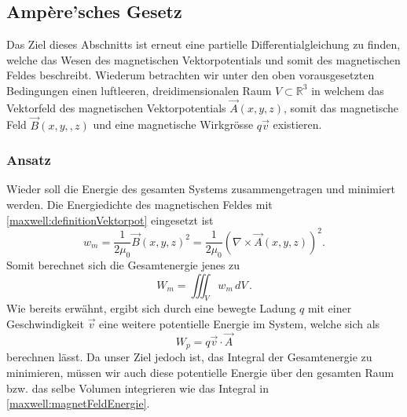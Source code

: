 

\subsection{Ampère'sches Gesetz}
Das Ziel dieses Abschnitts ist erneut eine partielle Differentialgleichung zu finden, welche das Wesen des magnetischen Vektorpotentials und somit des magnetischen Feldes beschreibt.
Wiederum betrachten wir unter den oben vorausgesetzten Bedingungen einen luftleeren, dreidimensionalen Raum $V \subset \mathbb{R}^3$ in welchem das Vektorfeld des magnetischen Vektorpotentials $\vec{A}(x,y,z)$, somit das magnetische Feld $\vec{B}(x,y,,z)$ und eine magnetische Wirkgrösse $q\vec{v}$  existieren. 

\subsubsection{Ansatz}

Wieder soll die Energie des gesamten Systems zusammengetragen und minimiert werden. 
Die Energiedichte des magnetischen Feldes mit \ref{maxwell:definitionVektorpot} eingesetzt ist
\[ w_m 
= 
\frac{1}{2\mu_0}\vec{B}(x,y,z)^2
=
\frac{1}{2\mu_0}\left(\nabla\times\vec{A}(x,y,z)\right)^2. \]
Somit berechnet sich die Gesamtenergie jenes zu 
\begin{equation}
	\label{maxwell:magnetFeldEnergie}
	W_m = \iiint_V w_m\, dV\,.
\end{equation}
Wie bereits erwähnt, ergibt sich durch eine bewegte Ladung $q$ mit einer Geschwindigkeit $\vec{v}$ eine weitere potentielle Energie im System, welche sich als 
\[ 
W_{p}
= 
q\vec{v}
\cdot
\vec{A}
 \]
berechnen lässt.
Da unser Ziel jedoch ist, das Integral der Gesamtenergie zu minimieren, müssen wir auch diese potentielle Energie über den gesamten Raum bzw. das selbe Volumen integrieren wie das Integral in \ref{maxwell:magnetFeldEnergie}. 


